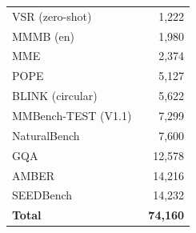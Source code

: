 \begin{table}[h]
\begin{tabular}{lr}
VSR (zero-shot)~\cite{liu2023vsr}             &  1,222  \\
MMMB (en)~\cite{sun2025mmmb}                  &  1,980  \\
MME~\cite{fu2026mme}                          &  2,374  \\
POPE~\cite{li2023pope}                        &  5,127  \\
BLINK (circular)~\cite{fu2024blink}           &  5,622  \\
MMBench-TEST (V1.1)~\cite{liu2024mmbench}     &  7,299  \\
NaturalBench~\cite{li2024naturalbench}        &  7,600  \\
GQA~\cite{hudson2019gqa}                      & 12,578  \\
AMBER~\cite{wang2023amber}                    & 14,216  \\
SEEDBench~\cite{li2024seedbench}              & 14,232  \\
\midrule
\textbf{Total}                                & \textbf{74,160} \\
\bottomrule
\end{tabular}
\end{table}

